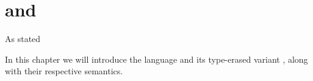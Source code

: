 \chapter{\ATAL and \ATALe}
\label{chap:lang}

As stated

In this chapter we will introduce the language \ATAL and its type-erased variant
\ATALe, along with their respective semantics.










